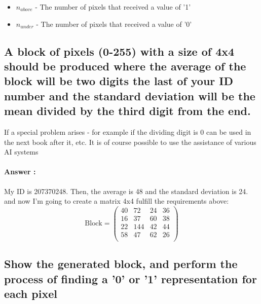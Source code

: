 \documentclass[letterpaper, 12pt]{article}
\begin{document}
\begin{itemize}
    \item $n_{above}$ - The number of pixels that received a value of '1'
    \item $n_{under}$ - The number of pixels that received a value of '0'
\end{itemize}

\subsection{A block of pixels (0-255) with a size of 4x4 should be produced where the average of the block will be two digits the last of your ID number and the standard deviation will be the mean divided by the third digit from the end.}
If a special problem arises - for example if the dividing digit is 0 can be used in the next book after it, etc. It is of course possible to use the assistance of various AI systems

\paragraph{Answer :}    
My ID is 207370248. Then, the average is 48 and the standard deviation is 24.
and now I'm going to create a matrix 4x4 fulfill the requirements above:\\
\[\text{Block} = \begin{pmatrix}
40 &72 &24 &36 \\
16 &37 &60 &38 \\
22 &144 &42 &44 \\
58 &47 &62 &26 \\
\end{pmatrix}\]



\subsection{Show the generated block, and perform the process of finding a '0' or '1' representation for each pixel}
\end{document}
